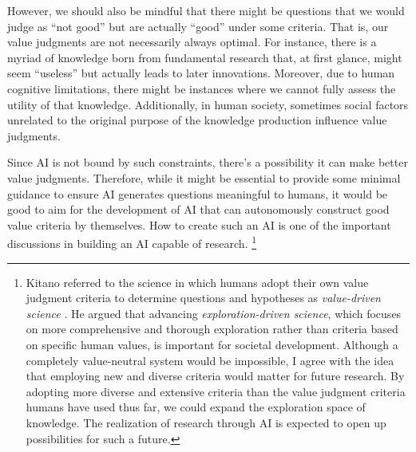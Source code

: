 However, we should also be mindful that there might be questions that we would judge as ``not good'' but are actually ``good'' under some criteria. That is, our value judgments are not necessarily always optimal. For instance, there is a myriad of knowledge born from fundamental research that, at first glance, might seem ``useless'' but actually leads to later innovations. Moreover, due to human cognitive limitations, there might be instances where we cannot fully assess the utility of that knowledge. Additionally, in human society, sometimes social factors unrelated to the original purpose of the knowledge production influence value judgments.

Since AI is not bound by such constraints, there's a possibility it can make better value judgments. Therefore, while it might be essential to provide some minimal guidance to ensure AI generates questions meaningful to humans, it would be good to aim for the development of AI that can autonomously construct good value criteria by themselves. How to create such an AI is one of the important discussions in building an AI capable of research. \footnote{
Kitano referred to the science in which humans adopt their own value judgment criteria to determine questions and hypotheses as \textit{value-driven science} \cite{kitano2021nobel}. He argued that advancing \textit{exploration-driven science}, which focuses on more comprehensive and thorough exploration rather than criteria based on specific human values, is important for societal development. Although a completely value-neutral system would be impossible, I agree with the idea that employing new and diverse criteria would matter for future research. By adopting more diverse and extensive criteria than the value judgment criteria humans have used thus far, we could expand the exploration space of knowledge. The realization of research through AI is expected to open up possibilities for such a future.
}




